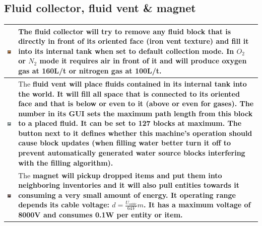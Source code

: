 \documentclass[11pt]{article} %
\makeatletter
\newcommand{\imgtex}{\begin{tabularx}{\textwidth}{@{}c@{ }X@{}}}
\makeatother
\begin{document}
\subsection{Fluid collector, fluid vent \& magnet}
\imgtex
\includegraphics[align = t]{blockCollector} & The \bf fluid collector \rm will try to remove any fluid block that is directly in front of its oriented face (iron vent texture) and fill it into its internal tank when set to default collection mode. In $O_2$ or $N_2$ mode it requires air in front of it and will produce oxygen gas at 160L/t or nitrogen gas at 100L/t. \\ \hline
\includegraphics[align = t]{blockVent} & The \bf fluid vent \rm will place fluids contained in its internal tank into the world. It will fill all space that is connected to its oriented face and that is below or even to it (above or even for gases). The number in its GUI sets the maximum path length from this block to a placed fluid. It can be set to 127 blocks at maximum. The button next to it defines whether this machine's operation should cause block updates (when filling water better turn it off to prevent automatically generated water source blocks interfering with the filling algorithm). \\ \hline
\includegraphics[align = t]{blockMagnet} & The \bf magnet \rm will pickup dropped items and put them into neighboring inventories and it will also pull entities towards it consuming a very small amount of energy. It operating range depends its cable voltage: $d = \frac{U_{cable}}{64V}m$. It has a maximum voltage of 8000V and consumes 0.1W per entity or item.
\end{tabularx}
\end{document}
